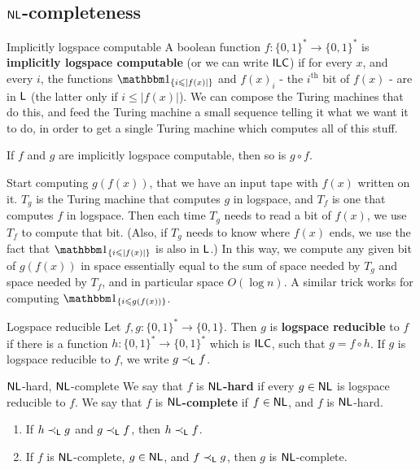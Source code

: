 \documentclass{article}
\begin{document}
\subsection{$\mathsf{NL}$-completeness}
\begin{fancydefine}{Implicitly logspace computable}
    A boolean function $f : \{0,1\}^{*} \to \{0,1\}^{*}$ is \textbf{implicitly logspace computable} (or we can write $\mathsf{ILC}$) if for every $x$, and every $i$, the functions $\bbone_{\{i \leq |f(x)|\}}$ and $f(x)_{i}$ - the $i^{\text{th}}$ bit of $f(x)$ - are in $\mathsf{L}$ (the latter only if $i \leq |f(x)|$). We can compose the Turing machines that do this, and feed the Turing machine a small sequence telling it what we want it to do, in order to get a single Turing machine which computes all of this stuff.
\end{fancydefine}
\begin{fancylem}{}
    If $f$ and $g$ are implicitly logspace computable, then so is $g\circ f$.
\end{fancylem}
\newlec
\proof Start computing $g(f(x))$,  that we have an input tape with $f(x)$ written on it. $T_{g}$ is the Turing machine that computes $g$ in logspace, and $T_{f}$
is one that computes $f$ in logspace. Then each time $T_{g}$ needs to read a bit of $f(x)$, we use $T_{f}$ to compute that bit. (Also, if $T_{g}$ needs to know where $f(x)$ ends, we use the fact that $\bbone_{\{i \leq |f(x)|\}}$ is also in $\mathsf{L}$.) In this way, we compute any given bit of $g(f(x))$ in space essentially equal to the sum of space needed by $T_{g}$ and space needed by $T_{f}$, and in particular space $O(\log n)$. A similar trick works for computing $\bbone_{\{i \leq g(f(x))\}}$. \endproof
\begin{fancydefine}{Logspace reducible}
    Let $f, g : \{0,1\}^{*} \to \{0,1\}$. Then $g$ is \textbf{logspace reducible} to $f$ if there is a function $h : \{0,1\}^{*}\to \{0,1\}^{*}$ which is $\mathsf{ILC}$, such that $g = f \circ h$. \gap 
    If $g$ is logspace reducible to $f$, we write $g \prec_{\mathsf{L}} f$.
\end{fancydefine}
\begin{fancydefine}{$\mathsf{NL}$-hard, $\mathsf{NL}$-complete}
    We say that $f$ is $\mathsf{NL}$\textbf{-hard} if every $g \in \mathsf{NL}$ is logspace reducible to $f$. We say that $f$ is $\mathsf{NL}$\textbf{-complete} if $f \in \mathsf{NL}$, and $f$ is $\mathsf{NL}$-hard.
\end{fancydefine}
\begin{fancylem}{}
    \begin{enumerate}
        \item If $h \prec_{\mathsf{L}} g$ and $g \prec_{\mathsf{L}} f$, then $h \prec_{\mathsf{L}} f$.
        \item If $f$ is $\mathsf{NL}$-complete, $g \in \mathsf{NL}$, and $f \prec_{\mathsf{L}} g$, then $g$ is $\mathsf{NL}$-complete.
    \end{enumerate}
\end{fancylem}
\end{document}
